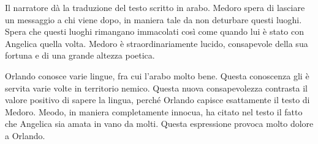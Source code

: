 \documentclass[a4paper]{article}
\begin{document}
Il narratore dà la traduzione del testo scritto in arabo.
Medoro spera di lasciare un messaggio a chi viene dopo, in maniera tale
da non deturbare questi luoghi.
Spera che questi luoghi rimangano immacolati così come quando lui è stato con Angelica
quella volta.
Medoro è straordinariamente lucido, consapevole della sua fortuna e
di una grande altezza poetica.

\begin{center} %
\begin{minipage}{0.5\textwidth}
\centering
{}
\end{minipage}
\end{center}

Orlando conosce varie lingue, fra cui l'arabo molto bene.
Questa conoscenza gli è servita varie volte in territorio nemico.
Questa nuova consapevolezza contrasta il valore positivo di sapere la lingua, perché
Orlando capisce esattamente il testo di Medoro.
Meodo, in maniera completamente innocua, ha citato nel testo il fatto che
Angelica sia amata in vano da molti. Questa espressione provoca molto dolore a
Orlando.

\begin{center} %
\begin{minipage}{0.5\textwidth}
\centering
{}
\end{minipage}
\end{center}
\end{document}
